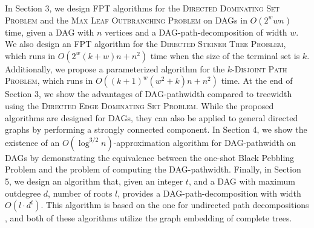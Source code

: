 \documentclass[runningheads]{llncs}
\theoremstyle{plain}
\theoremstyle{definition}
\begin{document}


In Section 3, we design FPT algorithms for the \textsc{Directed Dominating Set Problem} and the \textsc{Max Leaf Outbranching Problem} on DAGs in $O(2^w wn)$ time, given a DAG with $n$ vertices and a DAG-path-decomposition of width $w$. We also design an FPT algorithm for the \textsc{Directed Steiner Tree Problem}, which runs in $O(2^w(k + w)n + n^2)$ time when the size of the terminal set is $k$. Additionally, we propose a parameterized algorithm for the \textsc{$k$-Disjoint Path Problem}, which runs in $O((k + 1)^w(w^2 + k)n + n^2)$ time. At the end of Section 3, we show the advantages of DAG-pathwidth compared to treewidth using the \textsc{Directed Edge Dominating Set Problem}. While the proposed algorithms are designed for DAGs, they can also be applied to general directed graphs by performing a strongly connected component. In Section 4, we show the existence of an $O(\log^{3/2} n)$-approximation algorithm for DAG-pathwidth on DAGs by demonstrating the equivalence between the one-shot Black Pebbling Problem and the problem of computing the DAG-pathwidth. 
%
Finally, in Section 5, we design an algorithm that, given an integer $t$, and a DAG with maximum outdegree $d$, number of roots $l$, provides a DAG-path-decomposition with width $O(l \cdot d^t)$. This algorithm is based on the one for undirected path decompositions \cite{art8}, and both of these algorithms utilize the graph embedding of complete trees.
\end{document}
